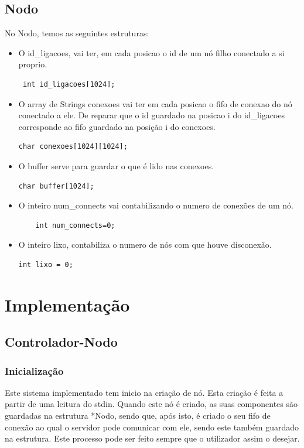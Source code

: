 \documentclass{report}
\begin{document}
\subsection{Nodo}
No Nodo, temos as seguintes estruturas:
\begin{itemize}
    \item O id\_ligacoes, vai ter, em cada posicao o id de um nó filho conectado a si proprio.
\begin{verbatim}
 int id_ligacoes[1024];
\end{verbatim}
    \item O array de Strings conexoes vai ter em cada posicao o fifo de conexao do nó conectado a ele. De reparar que o id guardado na posicao i do id\_ligacoes corresponde ao fifo guardado na posição i do conexoes.
\begin{verbatim}
char conexoes[1024][1024];
\end{verbatim}
    \item O buffer serve para guardar o que é lido nas conexoes.
\begin{verbatim}
char buffer[1024];    
\end{verbatim}
    \item O inteiro num\_connects vai contabilizando o numero de conexões de um nó.
\begin{verbatim}
    int num_connects=0;
\end{verbatim}
    \item O inteiro lixo, contabiliza o numero de nós com que houve disconexão.
\begin{verbatim}
int lixo = 0;
\end{verbatim}
\end{itemize}
\section{Implementação}
\subsection{Controlador-Nodo}

\subsubsection{Inicialização}
Este sistema implementado tem inicio na criação de nó. Esta criação é feita a partir de uma leitura do stdin. Quando este nó é criado, as suas componentes são guardadas na estrutura *Nodo, sendo que, após isto, é criado o seu fifo de conexão ao qual o servidor pode comunicar com ele, sendo este também guardado na estrutura. Este processo pode ser feito sempre que o utilizador assim o desejar.
\end{document}
